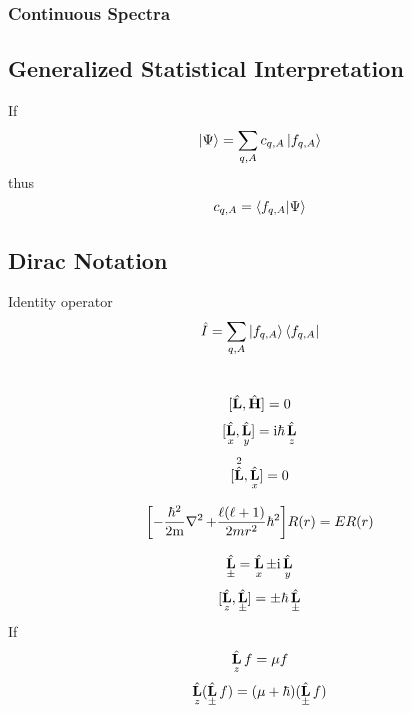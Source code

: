 \documentclass[UTF8]{ctexart} %
\renewcommand{\I}{\mathrm{i}}
\DeclareMathOperator{\hH}{\hat{\vb{H}}}
\DeclareMathOperator{\hL}{\hat{\vb{L}}}
\DeclareMathOperator{\Tna}{-\dfrac{\hbar^2}{2m}\nabla^2}
\numberwithin{equation}{subsection}
\begin{document}
\subsubsection{Continuous Spectra}



\subsection{Generalized Statistical Interpretation}
If
\begin{equation}\label{key}
\ket{\Psi} = \sum_{q,A} c_{q,A}\ket{f_{q,A}}
\end{equation}
thus 
\begin{equation}\label{key}
c_{q,A} = \braket{f_{q,A}}{\Psi}
\end{equation}

\subsection{}

\subsection{Dirac Notation}
Identity operator
\begin{equation}\label{key}
\hat{I} = \sum_{q,A}\ket{f_{q,A}}\bra{f_{q,A}}
\end{equation}

\section{}
\begin{equation}\label{key}
[\hL, \hH] = 0
\end{equation}
\begin{equation}\label{key}
[\hL_x, \hL_y] = \I\hbar\hL_z
\end{equation}
\begin{equation}\label{key}
[\hL^2, \hL_x] = 0
\end{equation}

\begin{equation}\label{key}
\qty[\Tna + \dfrac{\ell(\ell+1)}{2mr^2}\hbar^2]R(r) = E R(r)
\end{equation}

\begin{equation}\label{key}
\hL_\pm = \hL_x \pm \I\hL_y
\end{equation}
\begin{equation}\label{key}
[\hL_z, \hL_\pm] = \pm\hbar\hL_\pm
\end{equation}
If
\begin{equation}\label{key}
\hL_z f = \mu f
\end{equation}
\begin{equation}\label{key}
\hL_z(\hL_\pm f) = (\mu + \hbar)(\hL_\pm f)
\end{equation}
\end{document}
